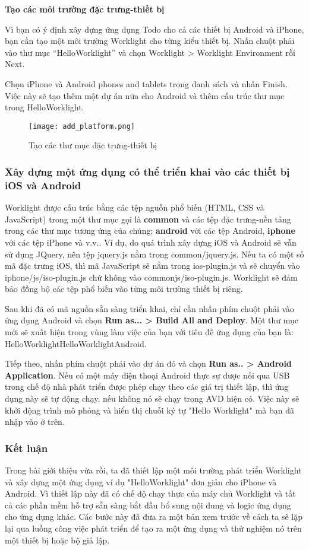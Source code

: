\textbf{Tạo các môi trường đặc trưng-thiết bị}

Vì bạn có ý định xây dựng ứng dụng Todo cho cả các thiết bị Android và iPhone, bạn cần tạo một môi trường Worklight cho từng kiểu thiết bị. Nhấn chuột phải vào thư mục “HelloWorklight” và chọn Worklight > Worklight Environment rồi Next.

Chọn iPhone và Android phones and tablets trong danh sách và nhấn Finish. Việc này sẽ tạo thêm một dự án nữa cho Android và thêm cấu trúc thư mục trong HelloWorklight.

\begin{figure}[!htb] 
\centering
\texttt{[image: add\_platform.png]}
\caption{Tạo các thư mục đặc trưng-thiết bị}
\end{figure}
\newpage

\subsubsection{Xây dựng một ứng dụng có thể triển khai vào các thiết bị iOS và Android}

Worklight được cấu trúc bằng các tệp nguồn phổ biến (HTML, CSS và JavaScript) trong một thư mục gọi là \textbf{common} và các tệp đặc trưng-nền tảng trong các thư mục tương ứng của chúng; \textbf{android} với các tệp Android, \textbf{iphone} với các tệp iPhone và v.v.. Ví dụ, do quá trình xây dựng iOS và Android sẽ vẫn sử dụng JQuery, nên tệp jquery.js nằm trong common/jquery.js. Nếu ta có một số mã đặc trưng iOS, thì mã JavaScript sẽ nằm trong ios-plugin.js và sẽ chuyển vào iphone/js/iso-plugin.js chứ không vào commonjs/iso-plugin.js. Worklight sẽ đảm bảo đồng bộ các tệp phổ biến vào từng môi trường thiết bị riêng.

Sau khi đã có mã nguồn sẵn sàng triển khai, chỉ cần nhấn phím chuột phải vào ứng dụng Android và chọn \textbf{Run as... > Build All and Deploy}. Một thư mục mới sẽ xuất hiện trong vùng làm việc của bạn với tiêu đề ứng dụng của bạn là: HelloWorklightHelloWorklightAndroid.

Tiếp theo, nhấn phím chuột phải vào dự án đó và chọn \textbf{Run as.. > Android Application}. Nếu có một máy điện thoại Android thực sự được nối qua USB trong chế độ nhà phát triển được phép chạy theo các giá trị thiết lập, thì ứng dụng này sẽ tự động chạy, nếu không nó sẽ chạy trong AVD hiện có. Việc này sẽ khởi động trình mô phỏng và hiển thị chuỗi ký tự "Hello Worklight" mà bạn đã nhập vào ở trên.

\subsubsection{Kết luận}
Trong bài giới thiệu vừa rồi, ta đã thiết lập một môi trường phát triển Worklight và xây dựng một ứng dụng ví dụ "HelloWorklight" đơn giản cho iPhone và Android. Vì thiết lập này đã có chế độ chạy thực của máy chủ Worklight và tất cả các phần mềm hỗ trợ sẵn sàng bắt đầu bổ sung nội dung và logic ứng dụng cho ứng dụng khác. Các bước này đã đưa ra một bản xem trước về cách ta sẽ lặp lại qua luồng công việc phát triển để tạo ra một ứng dụng và thử nghiệm nó trên một thiết bị hoặc bộ giả lập.


